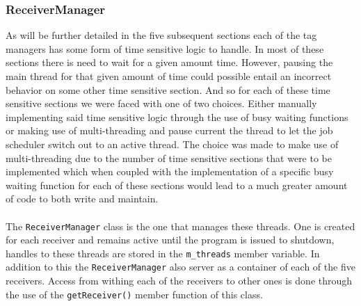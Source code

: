 \documentclass[11pt]{article}
\begin{document}
\subsubsection{ReceiverManager}
As will be further detailed in the five subsequent sections each of the tag
managers has some form of time sensitive logic to handle. In most of these
sections there is need to wait for a given amount time. However, pausing the
main thread for that given amount of time could possible entail an incorrect
behavior on some other time sensitive section. And so for each of these time
sensitive sections we were faced with one of two choices. Either manually
implementing said time sensitive logic through the use of busy waiting functions
or making use of multi-threading and pause current the thread to let the job
scheduler switch out to an active thread. The choice was made to make use of
multi-threading due to the number of time sensitive sections that were to be
implemented which when coupled with the implementation of a specific busy waiting
function for each of these sections would lead to a much greater amount of code
to both write and maintain.\\\\ The \texttt{ReceiverManager} class is the one
that manages these threads. One is created for each receiver and remains active
until the program is issued to shutdown, handles to these threads are stored in
the \texttt{m\_threads} member variable. In addition to this the
\texttt{ReceiverManager} also server as a container of each of the five
receivers. Access from withing each of the receivers to other ones is done
through the use of the \texttt{getReceiver()} member function of this class.
\end{document}
